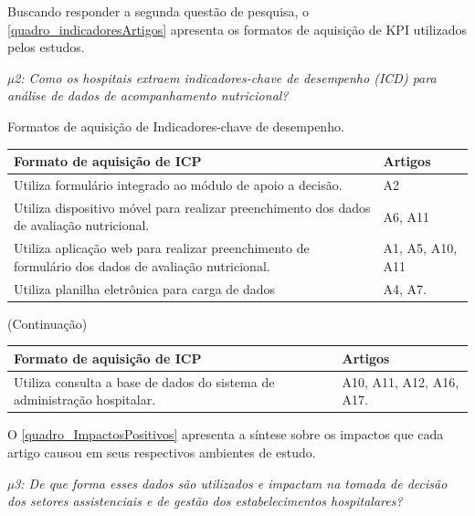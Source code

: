 Buscando responder a segunda questão de pesquisa, o \autoref{quadro_indicadoresArtigos} apresenta os formatos de aquisição de KPI utilizados pelos estudos.

\textit{µ2: Como os hospitais extraem indicadores-chave de desempenho (ICD) para análise de dados de acompanhamento nutricional?}

\begin{quadro}[htb]
\caption{\label{quadro_indicadoresArtigos}Formatos de aquisição de Indicadores-chave de desempenho.}
\label{}
\begin{tabular}{|p{11cm}|p{4cm}|}
	\hline
	\textbf{Formato de aquisição de ICP}   &   \textbf{Artigos}\\ \hline
	Utiliza formulário integrado ao módulo de apoio a decisão. &  A2\\ \hline
	Utiliza dispositivo móvel para realizar preenchimento dos dados de avaliação nutricional. & A6, A11\\ \hline
	Utiliza aplicação web para realizar preenchimento de formulário dos dados de avaliação nutricional. & A1, A5, A10, A11\\ \hline
	Utiliza planilha eletrônica para carga de dados & A4, A7.\\ \hline
\end{tabular}
\end{quadro}

\begin{quadro}[htb]
(Continuação)
\begin{tabular}{|p{11cm}|p{4cm}|}
	\hline
	\textbf{Formato de aquisição de ICP}   &   \textbf{Artigos}\\ \hline
	Utiliza consulta a base de dados do sistema de administração hospitalar. & A10, A11, A12, A16, A17.\\ \hline
\end{tabular}
\end{quadro}

\newpage
O \autoref{quadro_ImpactosPositivos} apresenta a síntese sobre os impactos que cada artigo causou em seus respectivos ambientes de estudo. 

\textit{µ3: De que forma esses dados são utilizados e impactam na tomada de decisão dos setores assistenciais e de gestão dos estabelecimentos hospitalares?}

